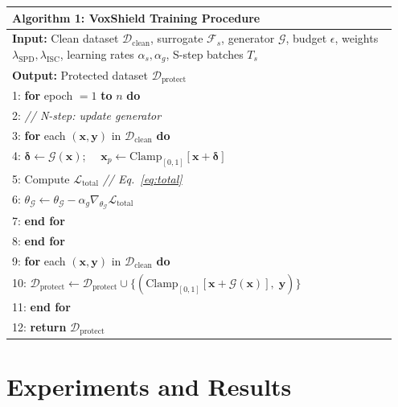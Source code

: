 \documentclass[runningheads]{llncs}
\begin{document}
\begin{table}[t]
\centering
\small
\setlength{\tabcolsep}{3pt}
\begin{tabular}{p{0.95\linewidth}}
\toprule
\textbf{Algorithm 1:} VoxShield Training Procedure \\
\midrule
\textbf{Input:} Clean dataset $\mathcal{D}_{\mathrm{clean}}$,
  surrogate $\mathcal{F}_s$, generator $\mathcal{G}$, budget
  $\epsilon$, weights $\lambda_{\text{SPD}},\lambda_{\text{ISC}}$, learning rates
  $\alpha_s,\alpha_g$, S-step batches $T_s$ \\
\textbf{Output:} Protected dataset $\mathcal{D}_{\mathrm{protect}}$ \\[2pt]
1: \textbf{for} epoch $= 1$ \textbf{to} $n$ \textbf{do} \\
2: \quad \textit{// N-step: update generator} \\
3: \quad \textbf{for} each $(\bm{x},\bm{y})$ in
  $\mathcal{D}_{\mathrm{clean}}$ \textbf{do} \\
4: \quad\quad $\bm{\delta}\leftarrow\mathcal{G}(\bm{x})$;~~
  $\bm{x}_p\leftarrow\mathrm{Clamp}_{[0,1]}[\bm{x}+\bm{\delta}]$ \\
5: \quad\quad Compute $\mathcal{L}_{\mathrm{total}}$
  \hfill \textit{// Eq.~\eqref{eq:total}} \\
6: \quad\quad $\theta_{\mathcal{G}}\leftarrow
  \theta_{\mathcal{G}}-\alpha_g\nabla_{\theta_{\mathcal{G}}}
  \mathcal{L}_{\mathrm{total}}$ \\
7: \quad \textbf{end for} \\
8: \textbf{end for} \\
9: \textbf{for} each $(\bm{x},\bm{y})$ in
  $\mathcal{D}_{\mathrm{clean}}$ \textbf{do} \\
10: \quad $\mathcal{D}_{\mathrm{protect}}\leftarrow
  \mathcal{D}_{\mathrm{protect}}\cup
  \{(\mathrm{Clamp}_{[0,1]}[\bm{x}+\mathcal{G}(\bm{x})],
  \;\bm{y})\}$ \\
11: \textbf{end for} \\
12: \textbf{return} $\mathcal{D}_{\mathrm{protect}}$ \\
\bottomrule
\end{tabular}
\label{alg:VoxShield}
\end{table}

\section{Experiments and Results}
\end{document}
